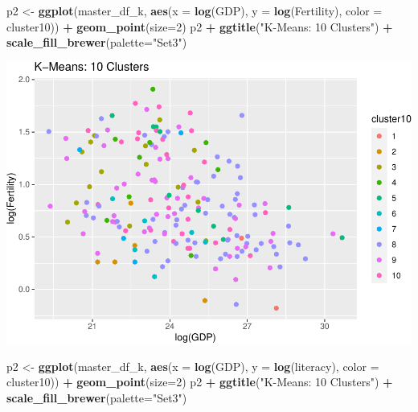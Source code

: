 \documentclass[]{article}
\newenvironment{Shaded}{\begin{snugshade}}{\end{snugshade}}
\newcommand{\DataTypeTok}[1]{\textcolor[rgb]{0.13,0.29,0.53}{#1}}
\newcommand{\DecValTok}[1]{\textcolor[rgb]{0.00,0.00,0.81}{#1}}
\newcommand{\KeywordTok}[1]{\textcolor[rgb]{0.13,0.29,0.53}{\textbf{#1}}}
\newcommand{\NormalTok}[1]{#1}
\newcommand{\OperatorTok}[1]{\textcolor[rgb]{0.81,0.36,0.00}{\textbf{#1}}}
\newcommand{\StringTok}[1]{\textcolor[rgb]{0.31,0.60,0.02}{#1}}
\begin{document}
\begin{Shaded}
\begin{Highlighting}[]
\NormalTok{p2 <-}\StringTok{ }\KeywordTok{ggplot}\NormalTok{(master_df_k, }\KeywordTok{aes}\NormalTok{(}\DataTypeTok{x =} \KeywordTok{log}\NormalTok{(GDP), }\DataTypeTok{y =} \KeywordTok{log}\NormalTok{(Fertility), }\DataTypeTok{color =}\NormalTok{ cluster10)) }\OperatorTok{+}
\StringTok{  }\KeywordTok{geom_point}\NormalTok{(}\DataTypeTok{size=}\DecValTok{2}\NormalTok{)}
\NormalTok{p2 }\OperatorTok{+}\StringTok{ }\KeywordTok{ggtitle}\NormalTok{(}\StringTok{"K-Means: 10 Clusters"}\NormalTok{) }\OperatorTok{+}\StringTok{ }\KeywordTok{scale_fill_brewer}\NormalTok{(}\DataTypeTok{palette=}\StringTok{"Set3"}\NormalTok{)}
\end{Highlighting}
\end{Shaded}

\includegraphics{eda_files/figure-latex/unnamed-chunk-30-3.pdf}

\begin{Shaded}
\begin{Highlighting}[]
\NormalTok{p2 <-}\StringTok{ }\KeywordTok{ggplot}\NormalTok{(master_df_k, }\KeywordTok{aes}\NormalTok{(}\DataTypeTok{x =} \KeywordTok{log}\NormalTok{(GDP), }\DataTypeTok{y =} \KeywordTok{log}\NormalTok{(literacy), }\DataTypeTok{color =}\NormalTok{ cluster10)) }\OperatorTok{+}
\StringTok{  }\KeywordTok{geom_point}\NormalTok{(}\DataTypeTok{size=}\DecValTok{2}\NormalTok{)}
\NormalTok{p2 }\OperatorTok{+}\StringTok{ }\KeywordTok{ggtitle}\NormalTok{(}\StringTok{"K-Means: 10 Clusters"}\NormalTok{) }\OperatorTok{+}\StringTok{ }\KeywordTok{scale_fill_brewer}\NormalTok{(}\DataTypeTok{palette=}\StringTok{"Set3"}\NormalTok{)}
\end{Highlighting}
\end{Shaded}
\end{document}
